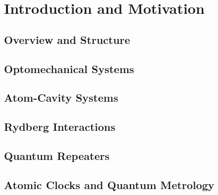 \chapter{Introduction and Motivation}

\section{Overview and Structure}
 
\section{Optomechanical Systems}

\section{Atom-Cavity Systems}

\section{Rydberg Interactions}

\section{Quantum Repeaters}

\section{Atomic Clocks and Quantum Metrology}
